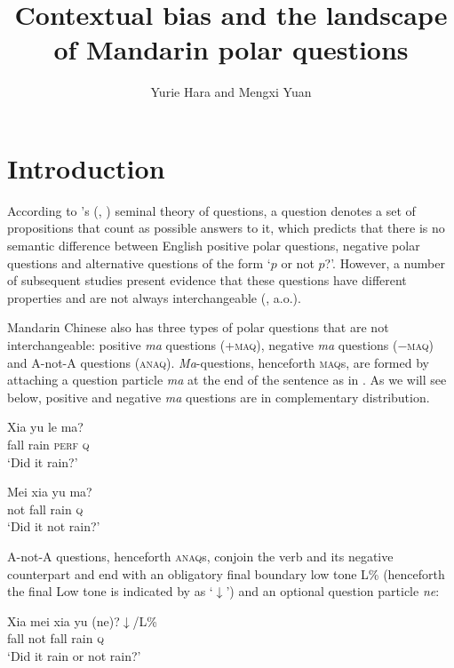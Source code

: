\documentclass[output=paper,colorlinks,citecolor=brown]{langscibook}
\author{Yurie Hara\orcid{0000-0002-9122-352X}\affiliation{Hokkaido University} and Mengxi Yuan\orcid{0000-0001-7667-2493}\affiliation{Jinan University}}
\title{Contextual bias and the landscape of Mandarin polar questions}
\begin{document}
\maketitle

\section{Introduction}

According to \citeauthor{Hamblin5}'s (\citeyear{Hamblin5}, \citeyear{Hamblin}) seminal theory of questions,  a question denotes a  set of propositions that count as possible answers to it, which predicts that there is no semantic difference between English positive polar
questions, negative polar questions and  alternative questions of the form `$p$ or not $p$?'. However, a number of subsequent studies present evidence   that these  questions have different properties and are not always interchangeable (\citealt{Bolinger, Ladd1981, BG, vs, Romero, Biezma, Roelofsen2010, BR, Sudo, Krifka15, Domaneschi, FR2017}, a.o.).

Mandarin Chinese also has  three  types of  polar questions that are not interchangeable: positive \textit{ma} questions  (+\textsc{maq}), negative \textit{ma} questions  ($-$\textsc{maq}) and A-not-A questions (\textsc{anaq}).  \emph{Ma}-questions, henceforth \textsc{maq}s, are formed by attaching a question particle \emph{ma} at the end of the sentence as in .  As we will see below, positive and negative \emph{ma} questions are in complementary distribution.

\ea\label{mapos}
\gll Xia yu le ma?\\
	fall rain  \textsc{perf} \textsc{q}\\
\glt	`Did it rain?'  
	\z

	
	
	
\ea\label{maneg}
\gll Mei xia yu  ma?\\
not fall rain   \textsc{q}\\
\glt 	`Did it not rain?'  
\z


 A-not-A questions, henceforth \textsc{anaq}s,  conjoin the verb and its negative counterpart and end with an obligatory final boundary low tone L\% (henceforth the final Low tone is indicated by as `$\downarrow$')	and an optional question particle \emph{ne}:
	
\ea \label{anaq}
\gll Xia mei xia yu (ne)?$\downarrow$/L\%\\
	fall not fall rain \textsc{q}\\
\glt	`Did it rain or not rain?'   
	\z
\end{document}
